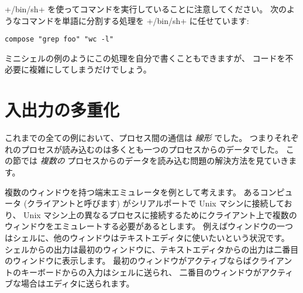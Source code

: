 \ml+/bin/sh+ を使ってコマンドを実行していることに注意してください。
次のようなコマンドを単語に分割する処理を \ml+/bin/sh+ に任せています:
%
\begin{lstlisting}
compose "grep foo" "wc -l"
\end{lstlisting}
%
ミニシェルの例のようにこの処理を自分で書くこともできますが、
コードを不必要に複雑にしてしまうだけでしょう。

\section{入出力の多重化}

これまでの全ての例において、プロセス間の通信は \emph{線形} でした。
つまりそれぞれのプロセスが読み込むのは多くとも一つのプロセスからのデータでした。
この節では \emph{複数の} プロセスからのデータを読み込む問題の解決方法を見ていきます。

複数のウィンドウを持つ端末エミュレータを例として考えます。
あるコンピュータ (クライアントと呼びます) がシリアルポートで Unix マシンに接続しており、
Unix マシン上の異なるプロセスに接続するためにクライアント上で複数の
ウィンドウをエミュレートする必要があるとします。
例えばウィンドウの一つはシェルに、他のウィンドウはテキストエディタに使いたいという状況です。
シェルからの出力は最初のウィンドウに、テキストエディタからの出力は二番目のウィンドウに表示します。
最初のウィンドウがアクティブならばクライアントのキーボードからの入力はシェルに送られ、
二番目のウィンドウがアクティブな場合はエディタに送られます。

